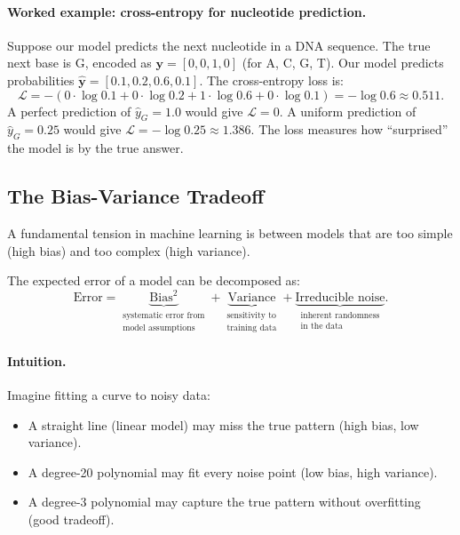 \paragraph{Worked example: cross-entropy for nucleotide prediction.} Suppose our model predicts the next nucleotide in a DNA sequence. The true next base is G, encoded as $\mathbf{y} = [0, 0, 1, 0]$ (for A, C, G, T). Our model predicts probabilities $\hat{\mathbf{y}} = [0.1, 0.2, 0.6, 0.1]$. The cross-entropy loss is:
\begin{equation}
\mathcal{L} = -(0 \cdot \log 0.1 + 0 \cdot \log 0.2 + 1 \cdot \log 0.6 + 0 \cdot \log 0.1) = -\log 0.6 \approx 0.511.
\end{equation}
A perfect prediction of $\hat{y}_G = 1.0$ would give $\mathcal{L} = 0$. A uniform prediction of $\hat{y}_G = 0.25$ would give $\mathcal{L} = -\log 0.25 \approx 1.386$. The loss measures how ``surprised'' the model is by the true answer.

\subsection{The Bias-Variance Tradeoff}

A fundamental tension in machine learning is between models that are too simple (high bias) and too complex (high variance).

\begin{dogmadef}
The expected error of a model can be decomposed as:
\begin{equation}
\text{Error} = \underbrace{\text{Bias}^2}_{\substack{\text{systematic error from} \\ \text{model assumptions}}} + \underbrace{\text{Variance}}_{\substack{\text{sensitivity to} \\ \text{training data}}} + \underbrace{\text{Irreducible noise}}_{\substack{\text{inherent randomness} \\ \text{in the data}}}.
\end{equation}
\end{dogmadef}

\paragraph{Intuition.} Imagine fitting a curve to noisy data:
\begin{itemize}[leftmargin=1.5em]
  \item A straight line (linear model) may miss the true pattern (high bias, low variance).
  \item A degree-20 polynomial may fit every noise point (low bias, high variance).
  \item A degree-3 polynomial may capture the true pattern without overfitting (good tradeoff).
\end{itemize}


